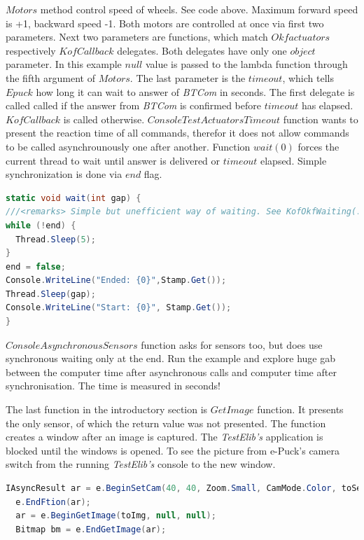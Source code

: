   $Motors$ method control speed of wheels. See code above. Maximum forward speed is +1, backward speed -1. 
  Both motors are controlled at once via first two parameters.
  Next two parameters are functions, which match $Okfactuators$ respectively $KofCallback$ delegates. 
  Both delegates have only one $object$ parameter. In this example $null$ value is passed
  to the lambda function through the fifth argument of $Motors$. The last parameter is the $timeout$, 
  which tells $Epuck$ how long it can wait to answer of {\it BTCom} in seconds.
  The first delegate is called called if the answer from {\it BTCom} is confirmed before $timeout$ has elapsed. 
  $KofCallback$ is called otherwise.
  $ConsoleTestActuatorsTimeout$ function wants to present the reaction time of all commands, 
  therefor it does not allow commands to be called asynchrounously one after another.
  Function $wait(0)$ forces the current thread to wait until answer is delivered
  or $timeout$ elapsed. Simple synchronization is done via $end$ flag.
\begin{lstlisting}[language=cs]
static void wait(int gap) {
///<remarks> Simple but unefficient way of waiting. See KofOkfWaiting(..) in Behaviour for usage of EventWaitHandle.</remarks>
while (!end) { 
  Thread.Sleep(5); 
} 
end = false; 
Console.WriteLine("Ended: {0}",Stamp.Get());
Thread.Sleep(gap);
Console.WriteLine("Start: {0}", Stamp.Get());
}
\end{lstlisting}

  $ConsoleAsynchronousSensors$ function asks for sensors too, but does use synchronous waiting only at the end. Run the example and explore huge gab
  between the computer time after asynchronous calls and computer time after synchronisation. 
  The time is measured in seconds!
  
  The last function in the introductory section is $GetImage$ function. 
  It presents the only sensor, of which the return value was not presented.
  The function creates a window after an image is captured. 
  The {\it TestElib's} application is blocked until the windows is opened. To see the picture from
  e-Puck's camera switch from the running {\it TestElib's} console to the new window.


\begin{lstlisting}[language=cs]
  IAsyncResult ar = e.BeginSetCam(40, 40, Zoom.Small, CamMode.Color, toSetCam, null, null);
  e.EndFtion(ar);
  ar = e.BeginGetImage(toImg, null, null);
  Bitmap bm = e.EndGetImage(ar);	
\end{lstlisting}


